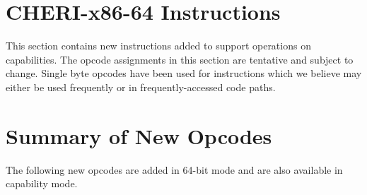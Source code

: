 \clearpage
\section{CHERI-x86-64 Instructions}

This section contains new instructions added to support operations on
capabilities.  The opcode assignments in this section are tentative
and subject to change.  Single byte opcodes have been used for
instructions which we believe may either be used frequently or in
frequently-accessed code paths.





























\clearpage
\section{Summary of New Opcodes}

The following new opcodes are added in 64-bit mode and are also
available in capability mode.

